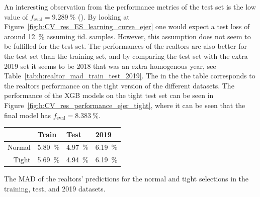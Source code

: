 An interesting observation from the performance metrics of the test set is the low value of $f_\mathrm{eval}=\SI{9.289}{\percent}$ (). By looking at Figure~\ref{fig:h:CV_res_ES_learning_curve_ejer} one would expect a test loss of around \SI{12}{\percent} assuming iid. samples. However, this assumption does not seem to be fulfilled for the test set. The performances of the realtors are also better for the test set than the training set, and by comparing the test set with the extra \num{2019} set it seems to be \num{2018} that was an extra homogenous year, see Table~\ref{tab:h:realtor_mad_train_test_2019}. The  in the the table corresponds to the realtors performance on the tight version of the different datasets. The performance of the XGB models on the tight test set can be seen in Figure~\ref{fig:h:CV_res_performance_ejer_tight}, where it can be seen that the final model has $f_\mathrm{eval}=\SI{8.383}{\percent}$. 
\begin{margintable}[-3cm]
  \centerfloat
  \begin{tabular}{@{}rlll@{}}
          & Train               & Test                & \num{2019}          \\ \midrule
  Normal  & \SI{5.80}{\percent} & \SI{4.97}{\percent} & \SI{6.19}{\percent} \\
  Tight   & \SI{5.69}{\percent} & \SI{4.94}{\percent} & \SI{6.19}{\percent} 
  \end{tabular}
  \vspace{\abovecaptionskip}
  \caption[Realtors' MAD]{The MAD of the realtors' predictions for the normal and tight selections in the training, test, and \num{2019} datasets.}
  \label{tab:h:realtor_mad_train_test_2019}
\end{margintable}

